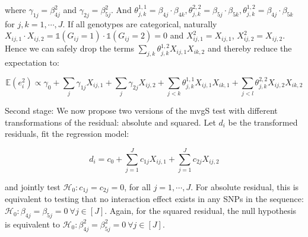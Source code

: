 \documentclass{article}
\begin{document}
   where $\gamma_{1j}=\beta_{4j}^2$  and $\gamma_{2j}=\beta_{5j}^2$. And $\theta^{1,1}_{j,k}=\beta_{4j}\cdot\beta_{4k}, \theta^{2,2}_{j,k}=\beta_{5j}\cdot\beta_{5k}, \theta^{1,2}_{j,k}=\beta_{4j}\cdot\beta_{5k}$  for $j,k=1,\cdots, J$. If all genotypes are categorical, naturally $X_{ij,1}\cdot X_{ij,2}=\mathds{1}(G_{ij}=1)\cdot\mathds{1}(G_{ij}=2)=0$ and $X_{ij,1}^2=X_{ij,1}$, $X_{ij,2}^2=X_{ij,2}$. Hence we can safely drop the terms $\sum_{j,k}\theta^{1,2}_{j,k}X_{ij,1}X_{ik,2}$ and thereby reduce the expectation to:
   
    \begin{equation}
    \mathbb{E}(e_i^2)\propto\gamma_0+\sum_j \gamma_{1j}X_{ij,1} +\sum_j \gamma_{2j} X_{ij,2} + \sum_{j<k}\theta^{1,1}_{j,k}X_{ij,1}X_{ik,1} + \sum_{j<l} \theta^{2,2}_{j,k}X_{ij,2}X_{ik,2}
    \end{equation} 
    
Second stage: We now propose two versions of the mvgS test with different transformations of the residual: absolute and squared. Let $d_i$ be the transformed residuals, fit the regression model:

 \begin{equation}
    d_i=c_0+\sum_{j=1}^J c_{1j}X_{ij,1}+\sum_{j=1}^J c_{2j}X_{ij,2}
 \end{equation}
    
 and jointly test $\mathcal{H}_0: c_{1j}=c_{2j}=0$, for all $j=1,\cdots,J$. For absolute residual, this is equivalent to testing that no interaction effect exists in any SNPs in the sequence: $\mathcal{H}_0:\beta_{4j}=\beta_{5j}=0\ \forall j\in[J]$. Again, for the squared residual, the null hypothesis is equivalent to $\mathcal{H}_0:\beta_{4j}^2=\beta_{5j}^2=0\ \forall j\in[J]$. 
\end{document}
